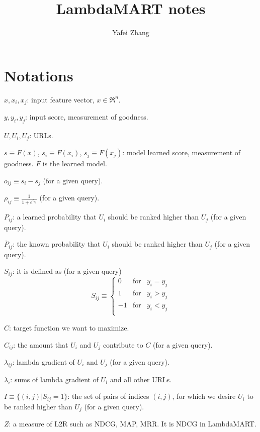 \documentclass [11pt,a4paper]{article}
\begin{document}
\title{LambdaMART notes}
\author{Yafei Zhang}
\maketitle
\tableofcontents
\newpage


\section{Notations}
$x, x_i, x_j$: input feature vector, $x \in \Re^{n}$.

$y, y_i, y_j$: input score, measurement of goodness.

$U, U_i, U_j$: URLs.

$s\equiv F(x)$, $s_i\equiv F(x_i)$, $s_j\equiv F(x_j)$: model learned score, measurement of goodness.
$F$ is the learned model.

$o_{ij} \equiv s_i - s_j$ (for a given query).

$\rho_{ij} \equiv \frac{1}{1+e^{o_{ij}}}$ (for a given query).

$P_{ij}$:
a learned probability that $U_i$ should be ranked higher than $U_j$ (for a given query).

$\overline{P}_{ij}$:
the known probability that $U_i$ should be ranked higher than $U_j$ (for a given query).

$S_{ij}$: it is defined as (for a given query)
\begin{equation}
S_{ij} \equiv \left\{
  \begin{array}{ccc}
    0  & \mbox{for} & y_i=y_j\\
    1  & \mbox{for} & y_i>y_j\\
    -1 & \mbox{for} & y_i<y_j\\
  \end{array}
\right.
\end{equation}

$C$: target function we want to maximize.

$C_{ij}$: the amount that $U_i$ and $U_j$ contribute to $C$ (for a given query).

$\lambda_{ij}$: lambda gradient of $U_i$ and $U_j$ (for a given query).

$\lambda_i$: sums of lambda gradient of $U_i$ and all other URLs.

$I \equiv \{(i,j) | S_{ij} = 1\}$: the set of pairs of indices $(i,j)$,
for which we desire $U_i$ to be ranked higher than $U_j$ (for a given query).

$Z$: a measure of L2R such as NDCG, MAP, MRR. It is NDCG in LambdaMART.
\end{document}
